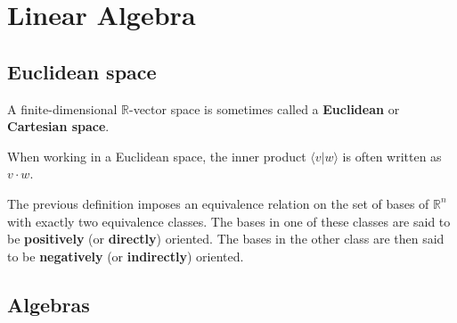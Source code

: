 \chapter{Linear Algebra}\label{chapter:linear_algebra}






\section{Euclidean space}

    A finite-dimensional $\mathbb{R}$-vector space is sometimes called a \textbf{Euclidean} or \textbf{Cartesian space}.

    \begin{notation}
        When working in a Euclidean space, the inner product $\langle v|w \rangle$ is often written as $v\cdot w$.
    \end{notation}

    \begin{result}
        The previous definition imposes an equivalence relation on the set of bases of $\mathbb{R}^n$ with exactly two equivalence classes. The bases in one of these classes are said to be \textbf{positively} (or \textbf{directly}) oriented. The bases in the other class are then said to be \textbf{negatively} (or \textbf{indirectly}) oriented.
    \end{result}

\section{Algebras}


